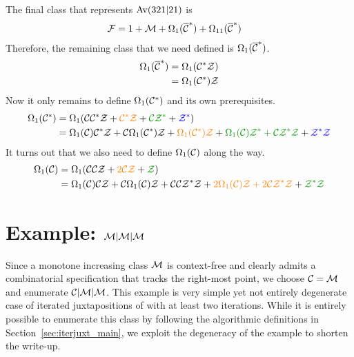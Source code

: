 \documentclass[12pt, a4paper, twoside]{report}
\begin{document}
The final class that represents $\mathrm{Av}(321|21)$ is 
\begin{align}
  \mathcal{F} &= 1 + \mathcal{M} + \Omega_1(\overline{\mathcal{C}}^*) + \Omega_{11}(\overline{\mathcal{C}}^*)
      \label{eq:example_final}
\end{align}
Therefore, the remaining class that we need defined is $\Omega_1(\overline{\mathcal{C}}^*)$.
\begin{align}
  \begin{aligned}
    \Omega_1(\overline{\mathcal{C}}^*) &= \Omega_1(\mathcal{C}^*\mathcal{Z})\\
    &= \Omega_1(\mathcal{C}^*)\mathcal{Z}
  \end{aligned}
  \label{eq:omega1barCstar}
\end{align}
Now it only remains to define $\Omega_1(\mathcal{C}^*)$ and its own prerequisites. 
\begin{align}
  \begin{aligned}
    \Omega_1(\Cstar) &= \Omega_1(\C\Cstar\Z + \textcolor{orange}{\Cstar\Z} + \textcolor{green}{\C\Z^*} + \textcolor{blue}{\Z^*})\\
    &= \Omega_1(\C)\Cstar\Z + \C\Omega_1(\Cstar)\Z + \textcolor{orange}{\Omega_1(\Cstar)\Z} + \textcolor{green}{\Omega_1(\C)\Z^* + \C\Z^*\Z} + \textcolor{blue}{\Z^*\Z}
  \end{aligned}
  \label{eq:exampleAv321Av21_omega1Cstar}
\end{align}
It turns out that we also need to define $\Omega_1(\mathcal{C})$ along the way.
\begin{align}
  \begin{aligned}
    \Omega_1(\C) &= \Omega_1(\C\C\Z + \textcolor{orange}{2\C\Z} + \textcolor{green}{\Z})\\
    &= \Omega_1(\C)\C\Z + \C\Omega_1(\C)\Z + \C\C\Z^*\Z + \textcolor{orange}{2\Omega_1(\C)\Z + 2\C\Z^*\Z} + \textcolor{green}{\Z^*\Z}
  \end{aligned}
  \label{eq:omega1C}
\end{align}

\section{Example: $\mathcal{M}|\mathcal{M}|\mathcal{M}$}
\label{sec:example_mmm}
Since a monotone increasing class $\mathcal{M}$ is context-free and clearly admits a combinatorial specification that tracks the right-most point, we choose $\mathcal{C} = \mathcal{M}$ and enumerate $\mathcal{C}|\mathcal{M}|\mathcal{M}$. This example is very simple yet not entirely degenerate case of iterated juxtapositions of with at least two iterations. While it is entirely possible to enumerate this class by following the algorithmic definitions in Section~\ref{sec:iterjuxt_main}, we exploit the degeneracy of the example to shorten the write-up.
\end{document}
